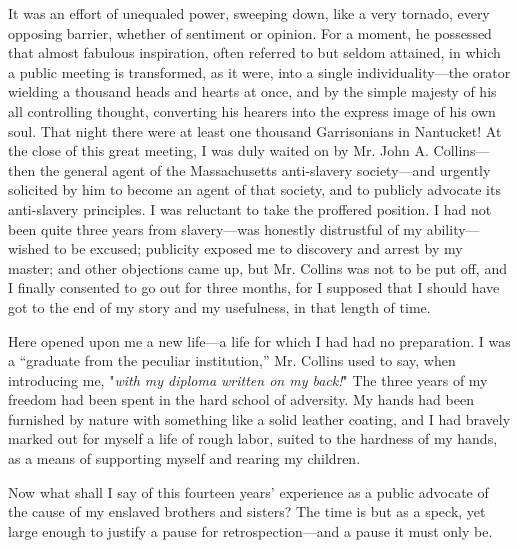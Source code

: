 It was an effort of unequaled power, sweeping down, like a very tornado,
every opposing barrier, whether of sentiment or opinion. For a moment,
he possessed that almost fabulous inspiration, often referred to but
seldom attained, in which a public meeting is transformed, as it were,
into a single individuality---the orator wielding a thousand heads and
hearts at once, and by the simple majesty of his all controlling
thought, converting his hearers into the express image of his own soul.
That night there were at least one thousand Garrisonians in Nantucket!
At the close of this great meeting, I was duly waited on by
{\protect\hypertarget{359}{}{}}Mr. John A. Collins---then the general
agent of the Massachusetts anti-slavery society---and urgently solicited
by him to become an agent of that society, and to publicly advocate its
anti-slavery principles. I was reluctant to take the proffered position.
I had not been quite three years from slavery---was honestly distrustful
of my ability---wished to be excused; publicity exposed me to discovery
and arrest by my master; and other objections came up, but Mr. Collins
was not to be put off, and I finally consented to go out for three
months, for I supposed that I should have got to the end of my story and
my usefulness, in that length of time.

Here opened upon me a new life---a life for which I had had no
preparation. I was a ``graduate from the peculiar institution,'' Mr.
Collins used to say, when introducing me, "\emph{with my diploma written
on my back!}" The three years of my freedom had been spent in the hard
school of adversity. My hands had been furnished by nature with
something like a solid leather coating, and I had bravely marked out for
myself a life of rough labor, suited to the hardness of my hands, as a
means of supporting myself and rearing my children.

Now what shall I say of this fourteen years' experience as a public
advocate of the cause of my enslaved brothers and sisters? The time is
but as a speck, yet large enough to justify a pause for
retrospection---and a pause it must only be.

